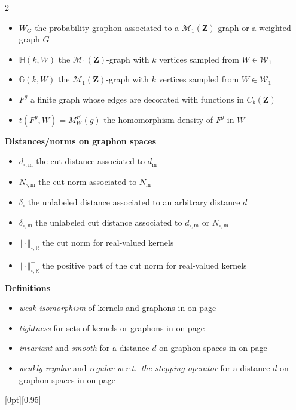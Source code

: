 \documentclass{amsart}
\newcommand{\cuthere}{%
\noindent
\raisebox{-2.8pt}[0pt][0.95\baselineskip]{\ding{34}}
\unskip{\tiny\dotfill}
}
\newcommand{\wrt}{w.r.t.\ }
\theoremstyle{plain}
\theoremstyle{definition}
\newcommand{\Space}{\mathbf{Z}}
\newcommand{\bbG}{\mathbb{G}}
\newcommand{\bbH}{\mathbb{H}}
\newcommand{\Proba}{\mathcal{M}_1(\Space)}
\newcommand{\CbFunct}{C_b(\Space)}
\newcommand{\Graphon}{\mathcal{W}_1}
\newcommand{\NcutRSymbol}{\Vert\cdot\Vert_{\square,\R}}
\newcommand{\NcutRpos}[1]{\Vert#1\Vert_{\square,\R}^+}
\newcommand{\m}{\mathrm{m}}
\newcommand{\dmeas}{d_\m}
\newcommand{\NmeasSymbol}{N_\m}
\newcommand{\dcut}{d_{\square,\m}}
\newcommand{\NcutSymbol}{N_{\square,\m}}
\newcommand{\ddcut}{\delta_{\square,\m}}
\newcommand{\dd}{\delta_{\square}}
\newcommand{\R}{\mathbb{R}}
\begin{document}
\begin{multicols}{2}
\begin{itemize}[leftmargin=*,itemsep=0.5em]
\item $W_G$ the probability-graphon associated to a $\Proba$-graph or a weighted graph $G$
\item $\bbH(k,W)$ the $\Proba$-graph with $k$ vertices sampled from $W\in\Graphon$
\item $\bbG(k,W)$ the $\Proba$-graph with $k$ vertices sampled from $W\in\Graphon$
\item $F^g$ a finite graph whose edges are decorated with functions in $\CbFunct$
\item $t(F^g,W) = M_W^F(g)$ the homomorphism density of $F^g$ in $W$
\end{itemize}
  \hrulefill
  \begin{center}
   \textbf{Distances/norms on graphon spaces}
\begin{itemize}[leftmargin=*,itemsep=0.5em]
\item $\dcut$ the cut distance associated to $\dmeas$
\item $\NcutSymbol$ the cut norm associated to $\NmeasSymbol$
\item $\dd$ the unlabeled distance associated to an arbitrary distance $d$
\item $\ddcut$ the unlabeled cut distance associated to $\dcut$ or $\NcutSymbol$
\item $\NcutRSymbol$ the cut norm for real-valued kernels
\item $\NcutRpos{\cdot}$ the positive part of the cut norm for real-valued kernels

      \end{itemize}
    \end{center}
 \hrulefill
  \begin{center}
   \textbf{Definitions}
\begin{itemize}[leftmargin=*,itemsep=0.5em]
\item  \emph{weak  isomorphism} of kernels and graphons in   on
  page~\pageref{def_weak_isomorphism}
\item  \emph{tightness}  for  sets of kernels or graphons   in    on
  page~\pageref{defi:tight}
\item \emph{invariant} and \emph{smooth}  for a distance $d$ on graphon spaces
	in  on page~\pageref{def:inv-smooth}

      \item  \emph{weakly   regular}  and  \emph{regular   \wrt  the
          stepping  operator} for  a distance  $d$ on  graphon spaces  in
           on page~\pageref{defi:extra-prop}
      \end{itemize}
    \end{center}

  \hrulefill
\end{multicols}
\cuthere

%


\end{document}
